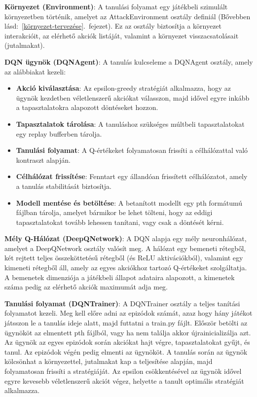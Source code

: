 \documentclass[
]{thesis-ekf}
\theoremstyle{definition}
\theoremstyle{remark}
\begin{document}
\textbf{Környezet (Environment)}: A tanulási folyamat egy játékbeli szimulált környezetben történik, amelyet az AttackEnvironment osztály definiál (Bővebben lásd:~\ref{környezet-tervezése}.~fejezet). Ez az osztály biztosítja a környezet interakcióit, az elérhető akciók listáját, valamint a környezet visszacsatolásait (jutalmakat).

\textbf{DQN ügynök (DQNAgent)}: A tanulás kulcseleme a DQNAgent osztály, amely az alábbiakat kezeli:

\begin{itemize}
	\item \textbf{Akció kiválasztása}: Az epsilon-greedy stratégiát alkalmazza, hogy az ügynök kezdetben véletlenszerű akciókat válasszon, majd idővel egyre inkább a tapasztalatokra alapozott döntéseket hozzon.
	\item \textbf{Tapasztalatok tárolása}: A tanuláshoz szükséges múltbeli tapasztalatokat egy replay bufferben tárolja.
	\item \textbf{Tanulási folyamat}: A Q-értékeket folyamatosan frissíti a célhálózattal való kontraszt alapján.
	\item \textbf{Célhálózat frissítése}: Fenntart egy állandóan frissített célhálózatot, amely a tanulás stabilitását biztosítja.
	\item \textbf{Modell mentése és betöltése}: A betanított modellt egy pth formátumú fájlban tárolja, amelyet bármikor be lehet tölteni, hogy az eddigi tapasztalatokat tovább lehessen tanítani, vagy csak a döntését kérni.
\end{itemize}

\textbf{Mély Q-Hálózat (DeepQNetwork)}: A DQN alapja egy mély neuronhálózat, amelyet a DeepQNetwork osztály valósít meg. A hálózat egy bemeneti rétegből, két rejtett teljes összeköttetésű rétegből (és ReLU aktivációkból), valamint egy kimeneti rétegből áll, amely az egyes akciókhoz tartozó Q-értékeket szolgáltatja. A bemenetek dimenziója a játékbeli állapot adataira alapozott, a kimenetek száma pedig az elérhető akciók maximumát adja meg. 

\textbf{Tanulási folyamat (DQNTrainer)}: A DQNTrainer osztály a teljes tanítási folyamatot kezeli. Meg kell előre adni az epizódok számát, azaz hogy hány játékot játsszon le a tanulás ideje alatt, majd futtatni a train.py fájlt. Először betölti az ügynököt az elmentett pth fájlból, vagy ha nem találja akkor újrainicializálja azt. Az ügynök az egyes epizódok során akciókat hajt végre, tapasztalatokat gyűjt, és tanul. Az epizódok végén pedig elmenti az ügynököt. A tanulás során az ügynök kölcsönhat a környezettel, jutalmakat kap a teljesítése alapján, majd folyamatosan frissíti a stratégiáját. Az epsilon csökkentésével az ügynök idővel egyre kevesebb véletlenszerű akciót végez, helyette a tanult optimális stratégiát alkalmazza. 
\end{document}
